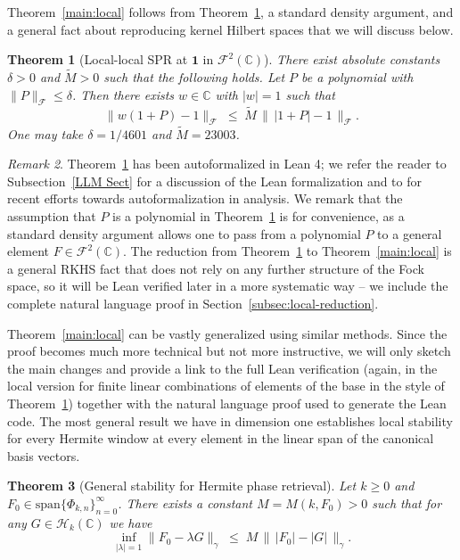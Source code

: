 \documentclass[11pt]{amsart}
\newtheorem{theorem}{Theorem}[section]
\theoremstyle{remark}
\newtheorem{remark}[theorem]{Remark}
\begin{document}
Theorem~\ref{main:local} follows from Theorem~\ref{thm:local}, a standard density argument, and a general fact about reproducing kernel Hilbert spaces that we will discuss below. 
\begin{theorem}[Local-local SPR at $\mathbf{1}$ in $\mathcal{F}^2(\mathbb{C})$]\label{thm:local}
There exist absolute constants $\delta > 0$ and $\widetilde{M} > 0$ such
that the following holds.  Let $P$ be a polynomial with
$\lVert P \rVert_{\mathcal{F}} \le \delta$.  Then there exists $w \in \mathbb{C}$ with $\lvert w \rvert = 1$
such that
\[
\lVert w(1+P) - 1 \rVert_{\mathcal{F}}
\;\le\;
\widetilde{M}\,
\bigl\|\, \lvert 1+P \rvert - 1 \,\bigr\|_{\mathcal{F}}.
\]
One may take $\delta = 1/4601$ and $\widetilde{M} = 23003$.
\end{theorem}
\begin{remark}
    Theorem~\ref{thm:local} has been autoformalized in Lean 4; we refer the reader to Subsection~\ref{LLM Sect} for a discussion of the Lean formalization and to \cite{armstrong2026formalization} for recent efforts towards autoformalization in analysis.  We remark that the assumption that $P$ is a polynomial in Theorem~\ref{thm:local} is for convenience, as a standard density argument allows one to pass from a polynomial $P$ to a general element $F\in \mathcal{F}^2(\mathbb{C})$. The reduction from Theorem~\ref{thm:local} to Theorem~\ref{main:local} is a general RKHS fact that does not rely on any further structure of the Fock space, so it will be Lean verified later in a more systematic way  -- we include the complete natural language proof in Section~\ref{subsec:local-reduction}.
\end{remark}

Theorem~\ref{main:local} can be vastly generalized using similar methods. Since the proof becomes much more technical but not more instructive, we will only sketch the main changes and provide a link to the full Lean verification (again, in the local version for finite linear combinations of elements of the base in the style of Theorem~\ref{thm:local}) together with the natural language proof used to generate the Lean code. The most general result we have in dimension one establishes local stability for every Hermite window at every element in the linear span of the canonical basis vectors.
\begin{theorem}[General stability for Hermite phase retrieval]\label{thm:local_Gen}
Let $k\geq 0$ and $F_0\in \text{span}\{\Phi_{k,n}\}_{n=0}^\infty$. There exists a constant $M=M(k,F_0)>0$ such
that for any $G\in \mathcal{H}_k(\mathbb{C})$ we have
\[
\inf_{|\lambda|=1}\lVert F_0 - \lambda G \rVert_\gamma
\;\le\;
M\,
\bigl\|\, \lvert F_0 \rvert - |G| \,\bigr\|_{\gamma}.
\]
\end{theorem}
\end{document}

